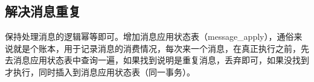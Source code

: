 \documentclass[../../../interview-questions.tex]{subfiles}
\begin{document}
\subsection{解决消息重复}

保持处理消息的逻辑幂等即可。增加消息应用状态表（message\_apply），通俗来说就是个账本，用于记录消息的消费情况，每次来一个消息，在真正执行之前，先去消息应用状态表中查询一遍，如果找到说明是重复消息，丢弃即可，如果没找到才执行，同时插入到消息应用状态表（同一事务）。
\end{document}
